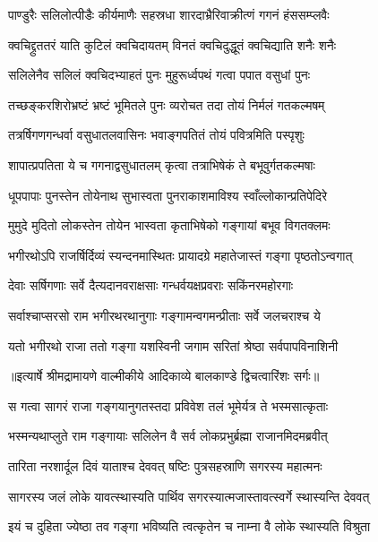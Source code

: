 \twolineshloka
{पाण्डुरैः सलिलोत्पीडैः कीर्यमाणैः सहस्रधा}
{शारदाभ्रैरिवाक्रीत्णं गगनं हंससम्प्लवैः} %

\twolineshloka
{क्वचिद्द्रुततरं याति कुटिलं क्वचिदायतम्}
{विनतं क्वचिदुद्धूतं क्वचिद्याति शनैः शनैः} %

\twolineshloka
{सलिलेनैव सलिलं क्वचिदभ्याहतं पुनः}
{मुहुरूर्ध्वपथं गत्वा पपात वसुधां पुनः} %

\twolineshloka
{तच्छङ्करशिरोभ्रष्टं भ्रष्टं भूमितले पुनः}
{व्यरोचत तदा तोयं निर्मलं गतकल्मषम्} %

\twolineshloka
{तत्रर्षिगणगन्धर्वा वसुधातलवासिनः}
{भवाङ्गपतितं तोयं पवित्रमिति पस्पृशुः} %

\twolineshloka
{शापात्प्रपतिता ये च गगनाद्वसुधातलम्}
{कृत्वा तत्राभिषेकं ते बभूवुर्गतकल्मषाः} %

\twolineshloka
{धूपपापाः पुनस्तेन तोयेनाथ सुभास्वता}
{पुनराकाशमाविश्य स्वाँल्लोकान्प्रतिपेदिरे} %

\twolineshloka
{मुमुदे मुदितो लोकस्तेन तोयेन भास्वता}
{कृताभिषेको गङ्गायां बभूव विगतक्लमः} %

\twolineshloka
{भगीरथोऽपि राजर्षिर्दिव्यं स्यन्दनमास्थितः}
{प्रायादग्रे महातेजास्तं गङ्गा पृष्ठतोऽन्वगात्} %

\twolineshloka
{देवाः सर्षिगणाः सर्वे दैत्यदानवराक्षसाः}
{गन्धर्वयक्षप्रवराः सकिंनरमहोरगाः} %

\twolineshloka
{सर्वाश्चाप्सरसो राम भगीरथरथानुगाः}
{गङ्गामन्वगमन्प्रीताः सर्वे जलचराश्च ये} %

\twolineshloka
{यतो भगीरथो राजा ततो गङ्गा यशस्विनी}
{जगाम सरितां श्रेष्ठा सर्वपापविनाशिनी} %


{॥इत्यार्षे श्रीमद्रामायणे वाल्मीकीये आदिकाव्ये बालकाण्डे द्विचत्वारिंशः सर्गः॥}


\twolineshloka
{स गत्वा सागरं राजा गङ्गयानुगतस्तदा}
{प्रविवेश तलं भूमेर्यत्र ते भस्मसात्कृताः} %

\twolineshloka
{भस्मन्यथाप्लुते राम गङ्गायाः सलिलेन वै}
{सर्व लोकप्रभुर्ब्रह्मा राजानमिदमब्रवीत्} %

\twolineshloka
{तारिता नरशार्दूल दिवं याताश्च देववत्}
{षष्टिः पुत्रसहस्राणि सगरस्य महात्मनः} %

\twolineshloka
{सागरस्य जलं लोके यावत्स्थास्यति पार्थिव}
{सगरस्यात्मजास्तावत्स्वर्गे स्थास्यन्ति देववत्} %

\twolineshloka
{इयं च दुहिता ज्येष्ठा तव गङ्गा भविष्यति}
{त्वत्कृतेन च नाम्ना वै लोके स्थास्यति विश्रुता} %


